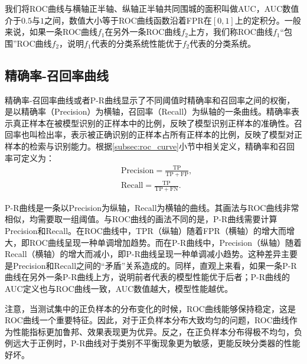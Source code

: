 我们将ROC曲线与横轴正半轴、纵轴正半轴共同围城的面积叫做AUC，AUC数值介于$0.5$与$1$之间，数值大小等于ROC曲线函数沿着FPR在$[0,1]$上的定积分。一般来说，如果一条ROC曲线$f_1$在另外一条ROC曲线$f_2$上方，我们称ROC曲线$f_1$“包围”ROC曲线$f_2$，说明$f_1$代表的分类系统性能优于$f_2$代表的分类系统。
\subsection{精确率-召回率曲线}\label{subsec:pr_curve}
精确率-召回率曲线或者P-R曲线显示了不同阈值时精确率和召回率之间的权衡，是以精确率（Precision）为横轴，召回率（Recall）为纵轴的一条曲线。精确率表示真正样本在被模型识别的正样本中的比例，反映了模型识别正样本的准确性。召回率也叫检出率，表示被正确识别的正样本占所有正样本的比例，反映了模型对正样本的检索与识别能力。根据\ref{subsec:roc_curve}小节中相关定义，精确率和召回率可定义为：
\begin{align}
	&\mathrm{Precision}=\frac{\mathrm{TP}}{\mathrm{TP}+\mathrm{FP}},\\
	&\mathrm{Recall}=\frac{\mathrm{TP}}{\mathrm{TP}+\mathrm{FN}}.
\end{align}


P-R曲线是一条以Precision为纵轴，Recall为横轴的曲线。其画法与ROC曲线非常相似，均需要取一组阈值。与ROC曲线的画法不同的是，P-R曲线需要计算Precision和Recall。在ROC曲线中，TPR（纵轴）随着FPR（横轴）的增大而增大，即ROC曲线呈现一种单调增加趋势。而在P-R曲线中，Precision（纵轴）随着Recall（横轴）的增大而减小，即P-R曲线呈现一种单调减小趋势。这种差异主要是Precision和Recall之间的“矛盾”关系造成的。同样，直观上来看，如果一条P-R曲线在另外一条P-R曲线上方，说明前者代表的模型性能优于后者；P-R曲线的AUC定义也与ROC曲线一致，AUC数值越大，模型性能越优。

注意，当测试集中的正负样本的分布变化的时候，ROC曲线能够保持稳定，这是ROC曲线一个重要特征。因此，对于正负样本分布大致均匀的问题，ROC曲线作为性能指标更加鲁邦、效果表现更为优异。反之，在正负样本分布得极不均匀，负例远大于正例时，P-R曲线对于类别不平衡现象更为敏感，更能反映分类器的性能好坏。

